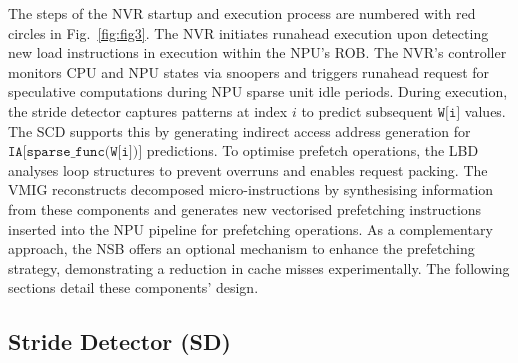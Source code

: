 The steps of the NVR startup and execution process are numbered with red circles in Fig.~\ref{fig:fig3}.
The NVR initiates runahead execution upon detecting new load instructions in execution within the NPU's ROB. 
The NVR's controller monitors CPU and NPU states via snoopers and triggers runahead request for speculative computations during NPU sparse unit idle periods.
During execution, the stride detector captures patterns at index $i$ to predict subsequent $\texttt{W[i]}$ values. 
The SCD supports this by generating indirect access address generation for $\texttt{IA[sparse\_func(W[i])]}$ predictions.
To optimise prefetch operations, the LBD analyses loop structures to prevent overruns and enables request packing. 
The VMIG reconstructs decomposed micro-instructions by synthesising information from these components and generates new vectorised prefetching instructions inserted into the NPU pipeline for prefetching operations.
As a complementary approach, the NSB offers an optional mechanism to enhance the prefetching strategy, demonstrating a reduction in cache misses experimentally. 
The following sections detail these components' design.

\vspace{-3pt}
\subsection{Stride Detector (SD)}
\vspace{-1.5pt}

